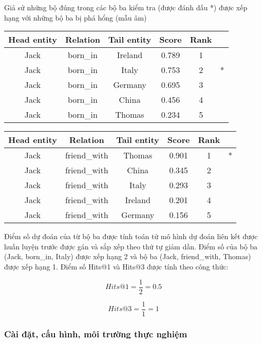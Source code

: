     Giả sử những bộ đúng trong các bộ ba kiểm tra (được đánh dấu *) được xếp hạng với những bộ ba bị phá hổng (mẫu âm)

    \begin{table}[H]
    \centering
    \begin{tabular}{cccccc}
    \hline
    Head entity &  Relation & Tail entity & Score & Rank & \\
    \hline
    Jack &  born\_in &  Ireland    &    0.789   &   1&\\
    Jack &  born\_in &  Italy      &    0.753    &  2&  *\\
    Jack &  born\_in &  Germany    &    0.695    &  3&\\
    Jack &  born\_in &  China      &    0.456    &  4&\\
    Jack &  born\_in &  Thomas     &    0.234    &  5&\\
    \hline
    \end{tabular}
    \end{table}

    \begin{table}[H]
    \centering
    \begin{tabular}{cccccc}
    \hline
    Head entity &  Relation & Tail entity & Score & Rank & \\
    \hline
    Jack &  friend\_with &  Thomas  &   0.901  &    1& *\\
    Jack &  friend\_with &  China    &  0.345  &    2&\\
    Jack &  friend\_with &  Italy    &  0.293  &    3&\\
    Jack &  friend\_with &  Ireland  &  0.201  &    4&\\
    Jack &  friend\_with &  Germany  &  0.156  &    5&\\
    \hline
    \end{tabular}
    \end{table}

    Điểm số dự đoán của từ bộ ba được tính toán tử mô hình dự đoán liên kết được huấn luyện trước được gán và sắp xếp theo thứ tự giảm dần. Điểm số của bộ ba (Jack, born\_in, Italy) được xếp hạng 2 và bộ ba (Jack, friend\_with, Thomas) được xếp hạng 1. Điểm số Hits@1 và Hits@3 được tính theo công thức:

    $$
    Hits@1 = \frac{1}{2} = 0.5
    $$

    $$
    Hits@3 = \frac{1}{1} = 1
    $$

\subsubsection{Cài đặt, cấu hình, môi trường thực nghiệm}

